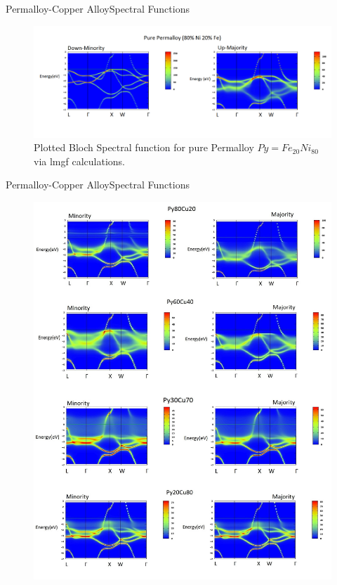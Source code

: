 \documentclass{beamer}
\begin{document}
\begin{frame}{Permalloy-Copper Alloy}{Spectral Functions}
 \begin{figure}[htp]
    \centering
    \begin{measuredfigure}
    \includegraphics[scale=0.27]{purepy}
    \caption{Plotted Bloch Spectral function for pure Permalloy $Py=Fe_{20}Ni_{80}$ via lmgf calculations.}
    \end{measuredfigure}
    \end{figure}
\end{frame}
\begin{frame}{Permalloy-Copper Alloy}{Spectral Functions}
  \begin{figure}[h!]
    \centering
    \begin{measuredfigure}
    \includegraphics[scale=0.14]{py}
    \end{measuredfigure}
    \end{figure}
\end{frame}
\end{document}
